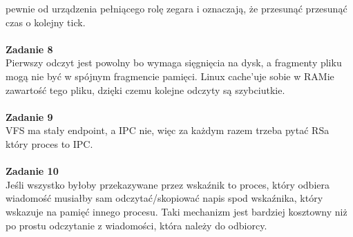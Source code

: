 \documentclass[12pt, a4paper, polish, openany]{book}
\begin{document}
pewnie od urządzenia pełniącego rolę zegara i oznaczają, że przesunąć przesunąć
czas o kolejny tick. \\\\
\textbf{Zadanie 8} \\
Pierwszy odczyt jest powolny bo wymaga sięgnięcia na dysk, a fragmenty pliku mogą nie być w spójnym fragmencie pamięci. Linux cache’uje sobie w RAMie zawartość tego pliku, dzięki czemu kolejne odczyty są szybciutkie. \\\\
\textbf{Zadanie 9} \\
VFS ma stały endpoint, a IPC nie, więc za każdym razem trzeba pytać RSa który proces to IPC. \\\\
\textbf{Zadanie 10} \\
Jeśli wszystko byłoby przekazywane przez wskaźnik to proces, który odbiera wiadomość musiałby
sam odczytać/skopiować napis spod wskaźnika, który wskazuje na pamięć innego procesu. Taki mechanizm jest bardziej kosztowny niż po prostu odczytanie z wiadomości, która należy do odbiorcy. \\\\
\end{document}
